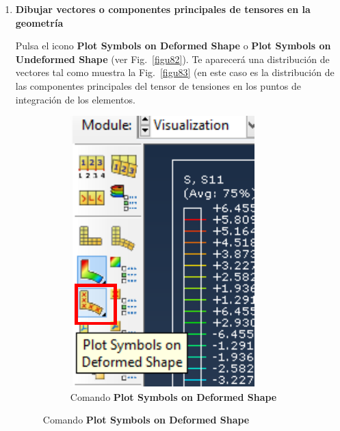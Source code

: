 \begin{enumerate}
\item \textbf{Dibujar vectores o componentes principales de tensores
    en la geometría} ~

  Pulsa el icono \textbf{Plot Symbols on Deformed Shape} o
  \textbf{Plot Symbols on Undeformed Shape} (ver
  Fig.~\ref{figu82}). Te aparecerá una distribución de vectores tal
  como muestra la Fig.~\ref{figu83} (en este caso es la distribución
  de las componentes principales del tensor de tensiones en los puntos
  de integración de los elementos.

  \begin{figure}[H]
    \centering
    \begin{subfigure}{0.29\textwidth}
      \includegraphics[width=\textwidth]{./body/images/imagen82.pdf}
      \caption{Comando \textbf{Plot Symbols on Deformed Shape}}

\end{subfigure}
\end{figure}
\end{enumerate}
